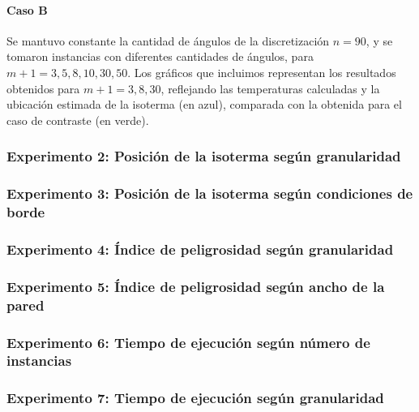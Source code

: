     \paragraph{Caso B} Se mantuvo constante la cantidad de ángulos de la discretización $n = 90$, y se tomaron instancias con diferentes cantidades de ángulos, para $m + 1 = 3, 5, 8, 10, 30, 50$. Los gráficos que incluimos representan los resultados obtenidos para $m + 1 = 3, 8, 30$, reflejando las temperaturas calculadas y la ubicación estimada de la isoterma (en azul), comparada con la obtenida para el caso de contraste (en verde).


  \subsubsection*{Experimento 2: Posición de la isoterma según granularidad}

  \subsubsection*{Experimento 3: Posición de la isoterma según condiciones de borde}

  \subsubsection*{Experimento 4: Índice de peligrosidad según granularidad}

  \subsubsection*{Experimento 5: Índice de peligrosidad según ancho de la pared}

  \subsubsection*{Experimento 6: Tiempo de ejecución según número de instancias}

  \subsubsection*{Experimento 7: Tiempo de ejecución según granularidad}


	
